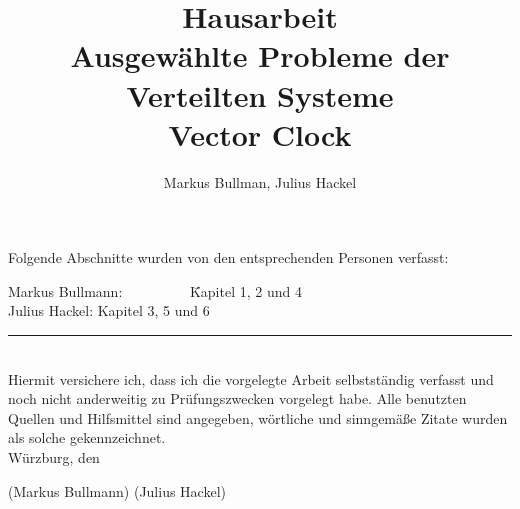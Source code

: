 \documentclass[a4paper]{article}
\author{Markus Bullman, Julius Hackel}
\title{Hausarbeit \\ Ausgewählte Probleme der Verteilten Systeme \\ Vector Clock}
\begin{document}
\maketitle
\clearpage

\noindent Folgende Abschnitte wurden von den entsprechenden Personen verfasst:
\begin{tabbing}
    Markus Bullmann:~~~~~~~~~ \= Kapitel 1, 2 und 4 \\
    Julius Hackel:        \> Kapitel 3, 5 und 6 \\
\end{tabbing}
\begin{center}\noindent\rule{10cm}{0.4pt}\end{center} ~\\
Hiermit versichere ich, dass ich die vorgelegte Arbeit selbstständig verfasst und noch nicht
anderweitig zu Prüfungszwecken vorgelegt habe. Alle benutzten Quellen und Hilfsmittel sind
angegeben, wörtliche und sinngemäße Zitate wurden als solche gekennzeichnet.\\[15mm]
Würzburg, den\\[20mm]

\begin{center}(Markus Bullmann) \hspace{60mm} (Julius Hackel)\end{center}

\clearpage

\tableofcontents
\clearpage


\cleardoublepage

\cleardoublepage

\cleardoublepage

\cleardoublepage

\cleardoublepage



\clearpage
\printbibliography
\end{document}
